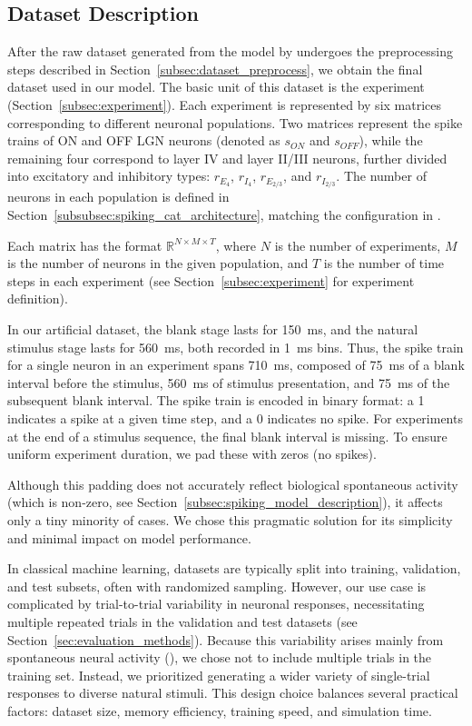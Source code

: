 \subsection{Dataset Description}
\label{subsec:dataset_description}

After the raw dataset generated from the model by \citet{antolik2024comprehensive} undergoes the preprocessing steps described in Section~\ref{subsec:dataset_preprocess}, we obtain the final dataset used in our model. The basic unit of this dataset is the experiment (Section~\ref{subsec:experiment}). Each experiment is represented by six matrices corresponding to different neuronal populations. Two matrices represent the spike trains of ON and OFF LGN neurons (denoted as $s_{ON}$ and $s_{OFF}$), while the remaining four correspond to layer IV and layer II/III neurons, further divided into excitatory and inhibitory types: $r_{E_{4}}$, $r_{I_{4}}$, $r_{E_{2/3}}$, and $r_{I_{2/3}}$. The number of neurons in each population is defined in Section~\ref{subsubsec:spiking_cat_architecture}, matching the configuration in \citet{antolik2024comprehensive}.

Each matrix has the format $\mathbb{R}^{N \times M \times T}$, where $N$ is the number of experiments, $M$ is the number of neurons in the given population, and $T$ is the number of time steps in each experiment (see Section~\ref{subsec:experiment} for experiment definition).

In our artificial dataset, the blank stage lasts for 150~ms, and the natural stimulus stage lasts for 560~ms, both recorded in 1~ms bins. Thus, the spike train for a single neuron in an experiment spans 710~ms, composed of 75~ms of a blank interval before the stimulus, 560~ms of stimulus presentation, and 75~ms of the subsequent blank interval. The spike train is encoded in binary format: a 1 indicates a spike at a given time step, and a 0 indicates no spike. For  experiments at the end of a stimulus sequence, the final blank interval is missing. To ensure uniform experiment duration, we pad these with zeros (no spikes).

Although this padding does not accurately reflect biological spontaneous activity (which is non-zero, see Section~\ref{subsec:spiking_model_description}), it affects only a tiny minority of cases. We chose this pragmatic solution for its simplicity and minimal impact on model performance.

In classical machine learning, datasets are typically split into training, validation, and test subsets, often with randomized sampling. However, our use case is complicated by trial-to-trial variability in neuronal responses, necessitating multiple repeated trials in the validation and test datasets (see Section~\ref{sec:evaluation_methods}). Because this variability arises mainly from spontaneous neural activity (\citet{antolik2024comprehensive}), we chose not to include multiple trials in the training set. Instead, we prioritized generating a wider variety of single-trial responses to diverse natural stimuli. This design choice balances several practical factors: dataset size, memory efficiency, training speed, and simulation time.

